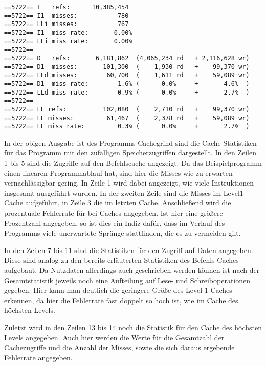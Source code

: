 \begin{singlespace}
\begin{scriptsize}
\begin{lstlisting}
==5722== I   refs:      10,385,454
==5722== I1  misses:           780
==5722== LLi misses:           767
==5722== I1  miss rate:       0.00%
==5722== LLi miss rate:       0.00%
==5722== 
==5722== D   refs:       6,181,862  (4,065,234 rd   + 2,116,628 wr)
==5722== D1  misses:       101,300  (    1,930 rd   +    99,370 wr)
==5722== LLd misses:        60,700  (    1,611 rd   +    59,089 wr)
==5722== D1  miss rate:        1.6% (      0.0%     +       4.6%  )
==5722== LLd miss rate:        0.9% (      0.0%     +       2.7%  )
==5722== 
==5722== LL refs:          102,080  (    2,710 rd   +    99,370 wr)
==5722== LL misses:         61,467  (    2,378 rd   +    59,089 wr)
==5722== LL miss rate:         0.3% (      0.0%     +       2.7%  )
\end{lstlisting}
\end{scriptsize}
\end{singlespace}

In der obigen Ausgabe ist des Programms Cachegrind sind die Cache-Statistiken für das Programm mit den zufälligen Speicherzugriffen dargestellt. In den Zeilen 1 bis 5 sind die Zugriffe auf den Befehlscache angezeigt. Da das Beispielprogramm einen linearen Programmablauf hat, sind hier die Misses wie zu erwarten vernachlässigbar gering. In Zeile 1 wird dabei angezeigt, wie viele Instruktionen insgesamt ausgeführt wurden. In der zweiten Zeile sind die Misses im Level1 Cache aufgeführt, in Zeile 3 die im letzten Cache. Anschließend wird die prozentuale Fehlerrate für bei Caches angegeben. Ist hier eine größere Prozentzahl angegeben, so ist dies ein Indiz dafür, dass im Verlauf des Programms viele unerwartete Sprünge stattfinden, die es zu vermeiden gilt.

In den Zeilen 7 bis 11 sind die Statistiken für den Zugriff auf Daten angegeben. Diese sind analog zu den bereits erläuterten Statistiken des Befehls-Caches aufgebaut. Da Nutzdaten allerdings auch geschrieben werden können ist nach der Gesamtstatistik jeweils noch eine Aufteilung auf Lese- und Schreiboperationen gegeben. Hier kann man deutlich die geringere Größe des Level 1 Caches erkennen, da hier die Fehlerrate fast doppelt so hoch ist, wie im Cache des höchsten Levels.

Zuletzt wird in den Zeilen 13 bis 14 noch die Statistik für den Cache des höchsten Levels angegeben. Auch hier werden die Werte für die Gesamtzahl der Cachezugriffe und die Anzahl der Misses, sowie die sich daraus ergebende Fehlerrate angegeben. 

